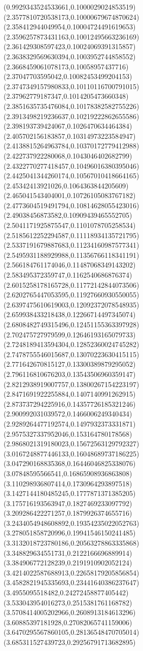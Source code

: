 {(0.9929343524533661,0.1000029024853519)
(2.3577810720538173,0.10000679674870624)
(2.358412944049954,0.10004724491619653)
(2.3596257873431163,0.10012495663236169)
(2.361429308597423,0.10024069391315857)
(2.3638329569630394,0.1003952744858552)
(2.3668459061078173,0.10058957437716)
(2.37047703595042,0.10082453499204153)
(2.3747349157980833,0.10110116700791015)
(2.37962779187347,0.1014205473660348)
(2.3851635735476084,0.10178382582755226)
(2.3913498219236637,0.10219222862655586)
(2.398193739424067,0.1026470634464384)
(2.405702156183857,0.10314973223584947)
(2.4138815264963784,0.10370172779412988)
(2.422737922280068,0.1043046402682799)
(2.4322770277418457,0.10496016380395046)
(2.4425041344260174,0.10567010418664165)
(2.45342413921026,0.1064363844205609)
(2.465041543404001,0.10726105083767182)
(2.4773604519491794,0.10814628055423016)
(2.49038456873582,0.10909439465552705)
(2.5041171925875547,0.1101078705258534)
(2.5185612252294587,0.11118934135721795)
(2.5337191679887683,0.11234160987577341)
(2.5495931188929988,0.11356766118341191)
(2.566184761174046,0.11487068349143202)
(2.583495372359747,0.1162540686876374)
(2.6015258178165728,0.11772142844073506)
(2.6202765447053595,0.11927660930550055)
(2.6397475610619003,0.12092372078548935)
(2.659938433218438,0.12266714497345074)
(2.6808482749315496,0.12451155363397928)
(2.702475727979599,0.12646193165079733)
(2.7248189413594304,0.12852360024745282)
(2.7478755546015687,0.13070223630415115)
(2.771642670815127,0.13300389879295052)
(2.796116810676203,0.13543506960359147)
(2.8212938919007757,0.13800267154223197)
(2.8471691922255884,0.1407140991262915)
(2.873737294225916,0.14357726185321246)
(2.900992031039572,0.1466006249340434)
(2.9289264477192574,0.1497932373331871)
(2.9575327337952046,0.153164780178568)
(2.9868021319180023,0.15672563129792327)
(3.0167248877446133,0.16048689737186225)
(3.047290168835368,0.16446046825338076)
(3.07848595566541,0.16865908936863808)
(3.110298936807414,0.1730964293897518)
(3.1427144180485245,0.1777871371385205)
(3.175716193563947,0.1827469233097792)
(3.209286422271257,0.1879926374655716)
(3.2434054948608892,0.19354235022052763)
(3.278051858720996,0.19941546150241485)
(3.3132018723780186,0.20563278863335868)
(3.348829634551731,0.2122166696889914)
(3.384906772128239,0.2191910902052124)
(3.4214022587688913,0.22658179205856854)
(3.4582821945335693,0.23441640386237647)
(3.4955095518482,0.24272458877405442)
(3.533043954016273,0.2515381761168782)
(3.5708414005202966,0.2608913184613296)
(3.60885397181928,0.27082065741159006)
(3.6470295567860105,0.28136548470705014)
(3.685311527439723,0.29256791713682895)
}
